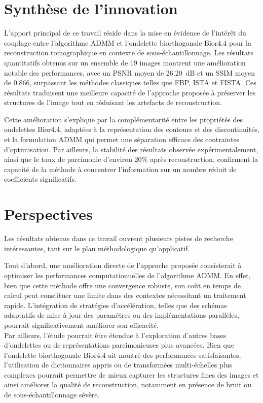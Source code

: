 \section{Synthèse de l'innovation}

L'apport principal de ce travail réside dans la mise en évidence de l'intérêt du couplage entre l'algorithme ADMM et l'ondelette biorthogonale Bior4.4 pour la reconstruction tomographique en contexte de sous-échantillonnage. Les résultats quantitatifs obtenus sur un ensemble de 19 images montrent une amélioration notable des performances, avec un PSNR moyen de \SI{26.20}{dB} et un SSIM moyen de 0.866, surpassant les méthodes classiques telles que FBP, ISTA et FISTA. Ces résultats traduisent une meilleure capacité de l'approche proposée à préserver les structures de l'image tout en réduisant les artefacts de reconstruction.

Cette amélioration s'explique par la complémentarité entre les propriétés des ondelettes Bior4.4, adaptées à la représentation des contours et des discontinuités, et la formulation ADMM qui permet une séparation efficace des contraintes d'optimisation. Par ailleurs, la stabilité des résultats observée expérimentalement, ainsi que le taux de parcimonie d'environ 20\% après reconstruction, confirment la capacité de la méthode à concentrer l'information sur un nombre réduit de coefficients significatifs.

\section{Perspectives}
Les résultats obtenus dans ce travail ouvrent plusieurs pistes de recherche intéressantes, tant sur le plan méthodologique qu'applicatif.

Tout d'abord, une amélioration directe de l'approche proposée consisterait à optimiser les performances computationnelles de l'algorithme ADMM. En effet, bien que cette méthode offre une convergence robuste, son coût en temps de calcul peut constituer une limite dans des contextes nécessitant un traitement rapide. L'intégration de stratégies d'accélération, telles que des schémas adaptatifs de mise à jour des paramètres ou des implémentations parallèles, pourrait significativement améliorer son efficacité.\\

Par ailleurs, l'étude pourrait être étendue à l'exploration d'autres bases d'ondelettes ou de représentations parcimonieuses plus avancées. Bien que l'ondelette biorthogonale Bior4.4 ait montré des performances satisfaisantes, l'utilisation de dictionnaires appris ou de transformées multi-échelles plus complexes pourrait permettre de mieux capturer les structures fines des images et ainsi améliorer la qualité de reconstruction, notamment en présence de bruit ou de sous-échantillonnage sévère.\\

